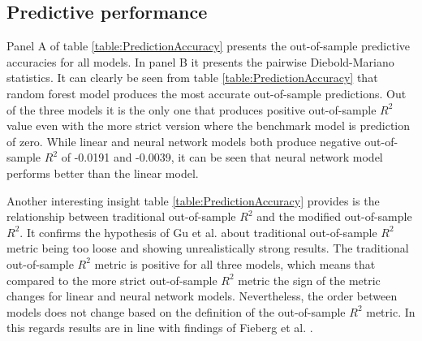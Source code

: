 \documentclass{article}
\begin{document}
\subsection{Predictive performance}\label{PredictivePerformance}

Panel A of table \ref{table:PredictionAccuracy} presents the out-of-sample predictive accuracies for all models. In panel B it presents the pairwise Diebold-Mariano statistics. It can clearly be seen from table \ref{table:PredictionAccuracy} that random forest model produces the most accurate out-of-sample predictions. Out of the three models it is the only one that produces positive out-of-sample $R^2$ value even with the more strict version where the benchmark model is prediction of zero. While linear and neural network models both produce negative out-of-sample $R^2$ of -0.0191 and -0.0039, it can be seen that neural network model performs better than the linear model. \par

Another interesting insight table \ref{table:PredictionAccuracy} provides is the relationship between traditional out-of-sample $R^2$ and the modified out-of-sample $R^2$. It confirms the hypothesis of Gu et al. \citeyear{guetal} about traditional out-of-sample $R^2$ metric being too loose and showing unrealistically strong results. The  traditional out-of-sample $R^2$ metric is positive for all three models, which means that compared to the more strict out-of-sample $R^2$ metric the sign of the metric changes for linear and neural network models. Nevertheless, the order between models does not change based on the definition of the out-of-sample $R^2$ metric. In this regards results are in line with findings of Fieberg et al. \citeyear{Fieberg}. \par
\end{document}
